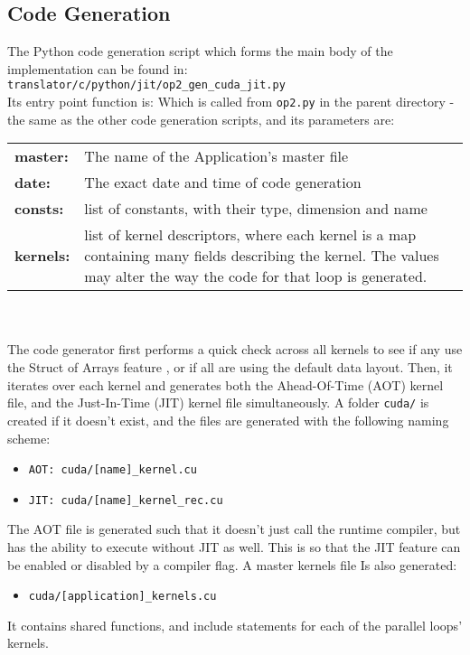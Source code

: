 \subsection{Code Generation}
\label{sec:codegen}
The Python code generation script which forms the main body of the implementation can be found in: \verb|translator/c/python/jit/op2_gen_cuda_jit.py|
\\
Its entry point function is:
Which is called from \verb|op2.py| in the parent directory - the same as the other code generation scripts, and its parameters are:\\
\begin{tabular}{>{\bfseries}l l}
  master: & The name of the Application's master file \\
  date: & The exact date and time of code generation \\
  consts: & list of constants, with their type, dimension and name \\
  kernels: & \parbox[t]{.8\textwidth}{list of kernel descriptors, where each kernel is a map containing many fields describing the kernel. The values may alter the way the code for that loop is generated.}
\end{tabular}
\\
\\
The code generator first performs a quick check across all kernels to see if any use the Struct of Arrays feature \cite[p13]{manual}, or if all are using the default data layout. Then, it iterates over each kernel and generates both the Ahead-Of-Time (AOT) kernel file, and the Just-In-Time (JIT) kernel file simultaneously. A folder \verb|cuda/| is created if it doesn't exist, and the files are generated with the following naming scheme:
\begin{itemize}
\vspace{-1em}
\item{\verb|AOT: cuda/[name]_kernel.cu|}
\vspace{-1em}
\item{\verb|JIT: cuda/[name]_kernel_rec.cu|}
\end{itemize}
The AOT file is generated such that it doesn't just call the runtime compiler, but has the ability to execute without JIT as well. This is so that the JIT feature can be enabled or disabled by a compiler flag. A master kernels file Is also generated:
\begin{itemize}
\vspace{-1em}
\item{\verb|cuda/[application]_kernels.cu|}
\end{itemize}
It contains shared functions, and include statements for each of the parallel loops' kernels.

